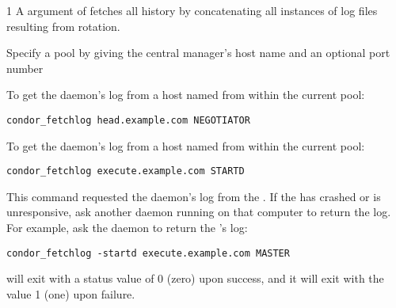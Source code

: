 \begin{ManPage}{\label{man-condor-fetchlog}}{1}
A  argument of  fetches all 
 history by concatenating all instances of log files
resulting from rotation.

\begin{Options}
    \ToolArgsBaseDesc
    {Specify a pool by giving the central manager's host name
    and an optional port number}
\end{Options}

\Examples
To get the  daemon's log from a host named 
 from within the current pool:
\begin{verbatim}
condor_fetchlog head.example.com NEGOTIATOR
\end{verbatim}

To get the  daemon's log from a host named
 from within the current pool:
\begin{verbatim}
condor_fetchlog execute.example.com STARTD
\end{verbatim}

This command requested the  daemon's log from the
.
If the  has crashed or is unresponsive,
ask another daemon
running on that computer to return the log.
For example, ask the  daemon to return the
's log:

\begin{verbatim}
condor_fetchlog -startd execute.example.com MASTER
\end{verbatim}

\ExitStatus
{} will exit with a status value of 0 (zero) upon success,
and it will exit with the value 1 (one) upon failure.

\end{ManPage}
